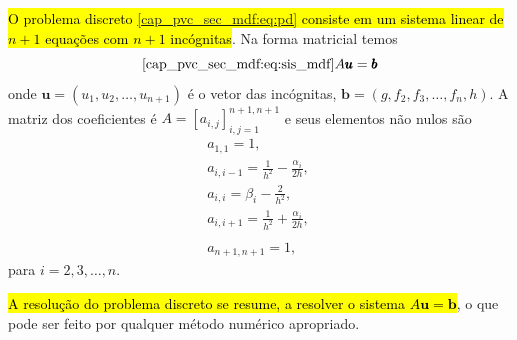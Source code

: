 \begin{flushleft}
\end{flushleft}

\hl{O problema discreto {\eqref{cap_pvc_sec_mdf:eq:pd}} consiste em um sistema linear de $n+1$ equações com $n+1$ incógnitas}. Na forma matricial temos
\begin{equation}\eqref{cap_pvc_sec_mdf:eq:sis_mdf}
  A\pmb{u} = \pmb{b}
\end{equation}
onde $\pmb{u} = (u_1, u_2, \dotsc, u_{n+1})$ é o vetor das incógnitas, $\pmb{b} = (g, f_2, f_3, \dotsc, f_{n}, h)$. A matriz dos coeficientes é  $A = [a_{i,j}]_{i,j=1}^{n+1,n+1}$ e seus elementos não nulos são
\begin{align}
  &a_{1,1} = 1,
  & ~ \nonumber \\
  &a_{i,i-1} = \frac{1}{h^2}-\frac{\alpha_i}{2h},\\
  &a_{i,i} = \beta_i - \frac{2}{h^2}, \\
  &a_{i,i+1} = \frac{1}{h^2}+\frac{\alpha_i}{2h},\\
  & ~ \nonumber \\
  &a_{n+1,n+1} = 1,
\end{align}
para $i = 2, 3, \dotsc, n$.

\hl{A resolução do problema discreto se resume, a resolver o sistema $A\pmb{u} = \pmb{b}$}, o que pode ser feito por qualquer método numérico apropriado.

